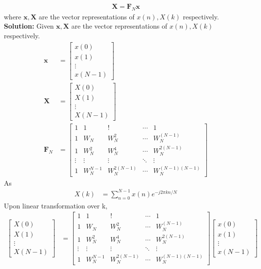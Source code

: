 \documentclass[journal,12pt,twocolumn]{IEEEtran}
\newcommand{\solution}{\noindent \textbf{Solution: }}
\let\vec\mathbf
\numberwithin{equation}{section}
\renewcommand\thesection{\arabic{section}}
\begin{document}
\begin{enumerate}[label=\arabic*.,ref=\thesection.\theenumi]
    \begin{align}
     \label{eq:dft-mat-def}
	    \vec{X} = \vec{F}_N \vec{x}
    \end{align}
		where $\vec{x}, \vec{X}$ are the vector representations of $x(n), X(k)$ respectively.\\
\solution Given $\vec{x}, \vec{X}$ are the vector representations of $x(n), X(k)$ respectively.
\begin{align}
\vec{x}&=\begin{bmatrix}
x(0)\\x(1)\\\vdots\\ x(N-1)
\end{bmatrix}\\
\vec{X}&=\begin{bmatrix}
X(0)\\X(1)\\ \vdots\\ X(N-1)
\end{bmatrix}\\
\vec{F}_N &=\begin{bmatrix}
1&1&!&\cdots&1\\1&W_N&W^2_N&\cdots&W_N^{(N-1)}\\1&W_N^2&W_N^4&\cdots&W^{2(N-1)}_N\\\vdots&\vdots&\vdots&\ddots&\vdots\\1&W_N^{N-1}&W_N^{2(N-1)}&\cdots&W_N^{(N-1)(N-1)}
\end{bmatrix}
\end{align}
As \begin{align} 
X(k)&=\sum_{n=0}^{N-1} x(n) e^{-j 2 \pi k n /N}
\end{align}
Upon linear transformation over k,
\begin{align}
\begin{bmatrix}
X(0)\\X(1)\\ \vdots\\ X(N-1)
\end{bmatrix}
&=\begin{bmatrix}
1&1&!&\cdots&1\\1&W_N&W^2_N&\cdots&W_N^{(N-1)}\\1&W_N^2&W_N^4&\cdots&W^{2(N-1)}_N\\\vdots&\vdots&\vdots&\ddots&\vdots\\1&W_N^{N-1}&W_N^{2(N-1)}&\cdots&W_N^{(N-1)(N-1)}
\end{bmatrix}\begin{bmatrix}
x(0)\\x(1)\\\vdots\\ x(N-1)

\end{bmatrix}
\end{align}
\end{enumerate}
\end{document}
